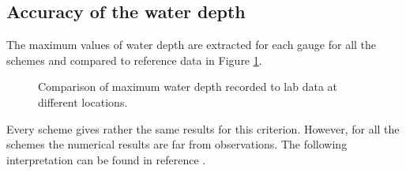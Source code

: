 \subsection{Accuracy of the water depth}

The maximum values of water depth are extracted for each gauge for all the
schemes and compared to reference data in Figure \ref{tab:malpasset:max}.

\begin{figure}[H]
\begin{minipage}[t]{0.5\textwidth}
 \centering
\end{minipage}
\begin{minipage}[t]{0.5\textwidth}
 \centering
\end{minipage}
\begin{minipage}[t]{0.5\textwidth}
 \centering
\end{minipage}
\begin{minipage}[t]{0.5\textwidth}
 \centering
\end{minipage}
\begin{minipage}[t]{0.5\textwidth}
 \centering
\end{minipage}
\newline
\begin{minipage}[t]{0.5\textwidth}
 \centering
\end{minipage}
\begin{minipage}[t]{0.5\textwidth}
 \centering
\end{minipage}
  \caption{Comparison of maximum water depth recorded to lab data at different locations.}
  \label{tab:malpasset:max}
\end{figure}

Every scheme gives rather the same results for this criterion.
However, for all the schemes the numerical results are far from observations.
The following interpretation can be found in reference \cite{Hervouet2007}.\\

